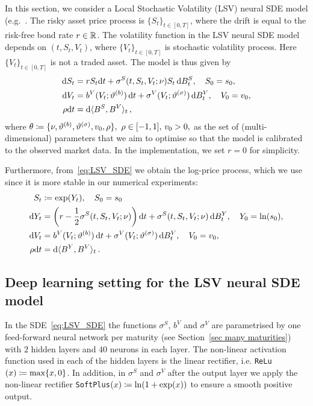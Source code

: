 In this section, we consider a Local Stochastic Volatility (LSV) neural SDE model (e.g.~\cite{Tian2015CalibratingModel}. The risky asset price process is $\{S_t\}_{t\in[0,T]}$, where the drift is equal to the risk-free bond rate $r\in\mathbb{R}$. The volatility function in the LSV neural SDE model
depends on $(t, S_t, V_t)$, where $\{V_t\}_{t\in[0,T]}$ is stochastic volatility process.
Here $\{V_t\}_{t\in[0,T]}$ is not a traded asset.
The model is thus given by
\begin{align}\label{eq:LSV_SDE}
\begin{split}
\mathrm{d} S_t & = r S_t\mathrm{d} t + \sigma^S(t,S_t, V_t; \nu)S_t \,\mathrm{d} B^S_t, \quad S_0 = s_0,\\
\mathrm{d} V_t & = b^V(V_t; \vartheta^{(b)})\,\mathrm{d} t + \sigma^V(V_t; \vartheta^{(\sigma)}) \,\mathrm{d} B^V_t, \quad V_0 = v_0, \\
\rho\mathrm{d} t & = \mathrm{d}\langle B^S, B^V\rangle_t \,,
\end{split}
\end{align}
where 
$\theta \coloneqq  \{\nu, \vartheta^{(b)}, \vartheta^{(\sigma)}, v_0, \rho \},\,\,\rho\in[-1,1],\,v_0>0, 
$
as the set of (multi-dimensional) parameters that we aim to optimise so that 
the model is calibrated to the observed market data. In the implementation, we set $r=0$ for simplicity.

Furthermore, from~\eqref{eq:LSV_SDE} we obtain the log-price process, which we use since it is more stable in our numerical experiments: 
\begin{align}\label{eq:LSV_SDE_log-price}
\begin{split}
S_t & \coloneqq  \exp(Y_t), \quad S_0=s_0 \\
\mathrm{d} Y_t & = \left(r-\frac{1}{2}\sigma^S(t,S_t,V_t;\nu)\right)\mathrm{d} t + \sigma^S(t,S_t, V_t; \nu) \,\mathrm{d} B^Y_t, \quad Y_0 = \ln(s_0),\\
\mathrm{d} V_t & = b^V(V_t; \vartheta^{(b)})\,\mathrm{d} t + \sigma^V(V_t; \vartheta^{(\sigma)}) \,\mathrm{d} B^V_t, \quad V_0 = v_0, \\
\rho\mathrm{d} t & = \mathrm{d}\langle B^Y, B^V\rangle_t\,. 
\end{split}
\end{align}


\subsection{Deep learning setting for the LSV neural SDE model}\label{sec:LSV_DL_setting}

In the SDE~\eqref{eq:LSV_SDE} the functions $\sigma^S$, $b^V$ and $\sigma^V$ are parametrised by one feed-forward neural 
network per maturity (see Section~\ref{sec many maturities}) with $2$ hidden layers and $40$ neurons in each layer. 
The non-linear activation function used in each of the hidden layers is the linear rectifier, i.e. \texttt{ReLu}$(x)\coloneqq \max\{x, 0\}$. In addition, in $\sigma^S$ and $\sigma^V$
after the output layer we apply the non-linear rectifier \texttt{SoftPlus}$(x)\coloneqq\ln(1+\exp(x))$ to ensure a smooth positive output. 

